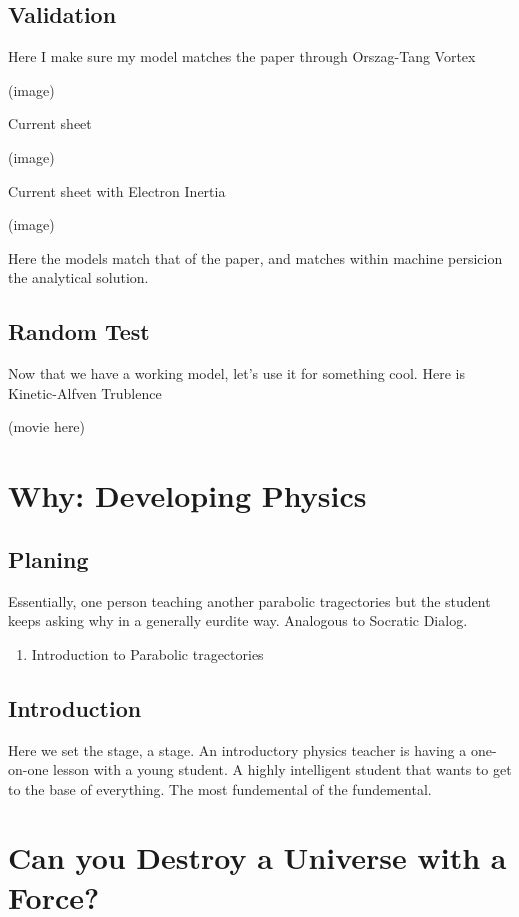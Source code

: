 \subsection{Validation}%
Here I make sure my model matches the paper through Orszag-Tang Vortex

(image)

Current sheet

(image)

Current sheet with Electron Inertia

(image)

Here the models match that of the paper, and matches within machine persicion the analytical solution.

\subsection{Random Test}

Now that we have a working model, let's use it for something cool. Here is Kinetic-Alfven Trublence

(movie here)



\section{Why: Developing Physics}


\subsection{Planing}

Essentially, one person teaching another parabolic tragectories but the student keeps asking why in a generally eurdite way. Analogous to Socratic Dialog.
\begin{enumerate}
  \item Introduction to Parabolic tragectories
\end{enumerate}


\subsection{Introduction}

Here we set the stage, a stage. An introductory physics teacher is having a one-on-one lesson with a young student. A highly intelligent student that wants to get to the base of everything. The most fundemental of the fundemental.


\section{Can you Destroy a Universe with a Force?}

